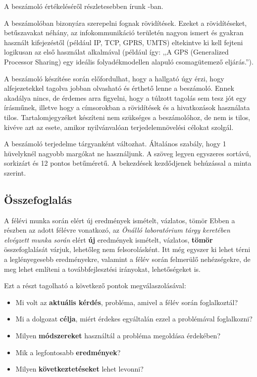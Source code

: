\documentclass[a4paper,oneside]{article}
\begin{document}
A beszámoló értékeléséről részletesebben írunk \cite{web}-ban.

A beszámolóban bizonyára szerepelni fognak rövidítések. Ezeket a
rövidítéseket, betűszavakat néhány, az infokommunikáció területén
nagyon ismert és gyakran használt kifejezéstől (például IP, TCP, GPRS,
UMTS) eltekintve ki kell fejteni logikusan az első használat
alkalmával (például így: ,,A GPS (Generalized Processor Sharing) egy
ideális folyadékmodellen alapuló csomagütemező eljárás.'').

A beszámoló készítése során előfordulhat, hogy a hallgató úgy érzi,
hogy alfejezetekkel tagolva jobban olvasható és érthető lenne a
beszámoló.  Ennek akadálya nincs, de érdemes arra figyelni, hogy a
túlzott tagolás sem tesz jót egy írásműnek, illetve hogy a címsorokban
a rövidítések és a hivatkozások használata tilos.  Tartalomjegyzéket
készíteni nem szükséges a beszámolóhoz, de nem is tilos, kivéve azt az
esete, amikor nyilvánvalóan terjedelemnövelési célokat szolgál.

A beszámoló terjedelme tárgyanként változhat.  Általános szabály, hogy
1 hüvelyknél nagyobb margókat ne használjunk.  A szöveg legyen
egyszeres sortávú, sorkizárt és 12 pontos betűméretű.  A bekezdések
kezdődjenek behúzással a minta szerint.

\subsection{Összefoglalás}
\label{sec:osszefoglalas}

A félévi munka során elért új eredmények ismételt, vázlatos, tömör
Ebben a részben az adott félévre vonatkozó, az \emph{Önálló
  laboratórium tárgy keretében elvégzett munka során} elért
\textbf{új} eredmények ismételt, vázlatos, \textbf{tömör}
összefoglalását várjuk, lehetőleg nem felsorolásként.  Itt még egyszer
ki lehet térni a leglényegesebb eredményekre, valamint a félév során
felmerülő nehézségekre, de meg lehet említeni a továbbfejlesztési
irányokat, lehetőségeket is.

Ezt a részt tagolható a következő pontok megválaszolásával:
\begin{itemize}
\item Mi volt az \textbf{aktuális kérdés}, probléma, amivel a félév
  során foglalkoztál?
\item Mi a dolgozat \textbf{célja}, miért érdekes egyáltalán ezzel a
  problémával foglalkozni?
\item Milyen \textbf{módszereket} használtál a probléma megoldása
  érdekében?
\item Mik a legfontosabb \textbf{eredmények}?
\item Milyen \textbf{következtetéseket} lehet levonni?

\end{itemize}
\end{document}
